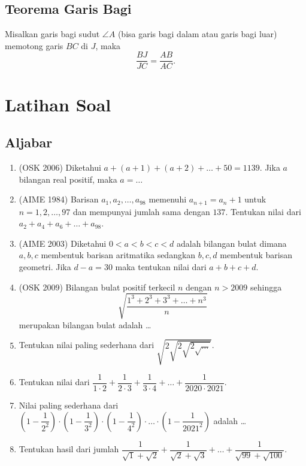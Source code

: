     \subsection{Teorema Garis Bagi}
    Misalkan garis bagi sudut $\angle A$ (bisa garis bagi dalam atau garis bagi luar) memotong garis $BC$ di $J$, maka 
    $$\dfrac{BJ}{JC} = \dfrac{AB}{AC}.$$
    
\section{Latihan Soal}

\subsection{Aljabar}
\begin{enumerate}
    \item (OSK 2006) Diketahui $a+(a+1)+(a+2)+\dots+50=1139$. Jika $a$ bilangan real positif, maka $a=\dots$
    
    \item (AIME 1984) Barisan $a_1,a_2,\dots,a_{98}$ memenuhi $a_{n+1}=a_n+1$ untuk $n=1,2,\dots,97$ dan mempunyai jumlah sama dengan $137$. Tentukan nilai dari $a_2+a_4+a_6+\dots+a_{98}$.
    
    \item (AIME 2003) Diketahui $0<a<b<c<d$ adalah bilangan bulat dimana $a,b,c$ membentuk barisan aritmatika sedangkan $b,c,d$ membentuk barisan geometri. Jika $d-a=30$ maka tentukan nilai dari $a+b+c+d$.
    
    \item (OSK 2009) Bilangan bulat positif terkecil $n$ dengan $n> 2009$ sehingga $$\sqrt{\dfrac{1^3+2^3+3^3+\dots+n^3}{n}}$$
    merupakan bilangan bulat adalah \dots
    
    \item Tentukan nilai paling sederhana dari $\sqrt{2\sqrt{2\sqrt{2\sqrt{\dots}}}}$.
    
    \item Tentukan nilai dari $\dfrac{1}{1\cdot2}+\dfrac{1}{2\cdot 3}+\dfrac{1}{3 \cdot 4}+\dots+\dfrac{1}{2020 \cdot 2021}.$
    
    \item  Nilai paling sederhana dari $\left(1-\dfrac{1}{2^2}\right)\cdot\left(1-\dfrac{1}{3^2}\right)\cdot\left(1-\dfrac{1}{4^2}\right)\cdot\dots\cdot\left(1-\dfrac{1}{2021^2}\right)$ adalah \dots
    
    \item Tentukan hasil dari jumlah $\dfrac{1}{\sqrt{1}+\sqrt{2}}+\dfrac{1}{\sqrt{2}+\sqrt{3}}+\dots+\dfrac{1}{\sqrt{99}+\sqrt{100}}.$
    

\end{enumerate}
